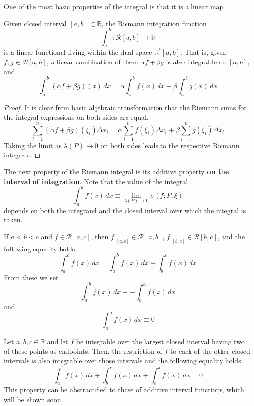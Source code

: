 \documentclass{article}
\begin{document}
      One of the most basic properties of the integral is that it is a linear map. 
      \begin{lemma}
        Given closed interval $[a, b] \subset \mathbb{R}$, the Riemann integration function 
        \[\int_a^b: \mathcal{R}[a, b] \longrightarrow \mathbb{R}\]
        is a linear functional living within the dual space $\mathbb{R}^* [a, b]$. That is, given $f, g \in \mathcal{R}[a, b]$, a linear combination of them $\alpha f + \beta g$ is also integrable on $[a,b]$, and 
        \[\int_a^b (\alpha f + \beta g)(x)\,dx = \alpha \int_a^b f(x)\,dx + \beta \int_a^b g(x)\,dx\]
      \end{lemma}
      \begin{proof}
      It is clear from basic algebraic transformation that the Riemann sums for the integral expressions on both sides are equal. 
      \[\sum_{i=1}^n (\alpha f + \beta g) (\xi_i) \Delta x_i = \alpha \sum_{i=1}^n f(\xi_i) \Delta x_i + \beta \sum_{i=1}^n g(\xi_i) \Delta x_i\]
      Taking the limit as $\lambda(P) \rightarrow 0$ on both sides leads to the respective Riemann integrals. 
      \end{proof}


      The next property of the Riemann integral is its additive property \textbf{on the interval of integration}. Note that the value of the integral 
      \[\int_a^b f(x) \,dx \equiv \lim_{\lambda(P) \rightarrow 0} \sigma(f; P, \xi)\]
      depends on both the integrand and the closed interval over which the integral is taken. 

      \begin{lemma}
        If $a < b < c$ and $f \in \mathcal{R}[a, c]$, then $f \big|_{[a,b]} \in \mathcal{R}[a, b]$, $f \big|_{[b,c]} \in \mathcal{R}[b, c]$, and the following equality holds 
        \[\int_a^c f(x)\,dx = \int_a^b f(x)\, dx + \int_b^c f(x)\,dx\]
        From these we set
        \[\int_a^b f(x)\,dx \equiv - \int_b^a f(x)\,dx\]
        and 
        \[\int_a^a f(x)\,dx \equiv 0\]
      \end{lemma}

      \begin{theorem}
      Let $a, b, c \in \mathbb{R}$ and let $f$ be integrable over the largest closed interval having two of these points as endpoints. Then, the restriction of $f$ to each of the other closed intervals is also integrable over those intervals and the following equality holds. 
      \[\int_a^b f(x)\,dx + \int_b^c f(x)\,dx + \int_c^a f(x)\,dx = 0\]
      This property can be abstractified to those of additive interval functions, which will be shown soon. 
      \end{theorem}
\end{document}
